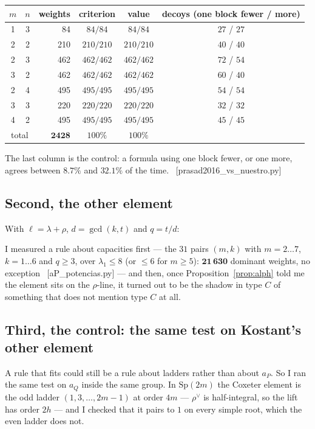 \documentclass[11pt,a4paper]{article}
\theoremstyle{definition}
\newcommand{\Sp}{\mathrm{Sp}}
\newcommand{\rhoh}{\rho^{\vee}}
\newcommand{\ver}[1]{\unskip\penalty0\ \textcolor{azul}{\small\textsf{[#1]}}}
\begin{document}
\begin{center}
\small
{}
\begin{tabular}{ccrccc}
\toprule
\rowcolor{cabecera}$m$ & $n$ & weights & criterion & value & decoys (one block fewer / more)\\
\midrule
1&3& 84 & $84/84$ & $84/84$ & $27$ / $27$\\
2&2& 210 & $210/210$ & $210/210$ & $40$ / $40$\\
2&3& 462 & $462/462$ & $462/462$ & $72$ / $54$\\
3&2& 462 & $462/462$ & $462/462$ & $60$ / $40$\\
2&4& 495 & $495/495$ & $495/495$ & $54$ / $54$\\
3&3& 220 & $220/220$ & $220/220$ & $32$ / $32$\\
4&2& 495 & $495/495$ & $495/495$ & $45$ / $45$\\
\midrule
\multicolumn{2}{c}{total} & $\mathbf{2428}$ & $100\%$ & $100\%$ & \\
\bottomrule
\end{tabular}
\end{center}

\noindent The last column is the control: a formula using one block fewer, or one more, agrees
between $8.7\%$ and $32.1\%$ of the time. \ver{prasad2016\_vs\_nuestro.py}


\subsection*{Second, the other element}

With $\ell=\lambda+\rho$, $d=\gcd(k,t)$ and $q=t/d$:

\noindent I measured a rule about capacities first --- the $31$ pairs $(m,k)$ with $m=2\ldots7$,
$k=1\ldots6$ and $q\ge3$, over $\lambda_1\le8$ (or $\le6$ for $m\ge5$): $\mathbf{21\,630}$ dominant
weights, no exception \ver{aP\_potencias.py} --- and then, once Proposition~\ref{prop:alph} told me
the element sits on the $\rho$-line, it turned out to be the shadow in type $C$ of something that
does not mention type $C$ at all.

\smallskip

\subsection*{Third, the control: the same test on Kostant's other element}

A rule that fits could still be a rule about ladders rather than about $a_P$. So I ran the same test
on $a_Q$ inside the same group. In $\Sp(2m)$ the Coxeter element is the odd ladder
$(1,3,\dots,2m-1)$ at order $4m$ --- $\rhoh$ is half-integral, so the lift has order $2h$ --- and I
checked that it pairs to $1$ on every simple root, which the even ladder does not.
\end{document}
